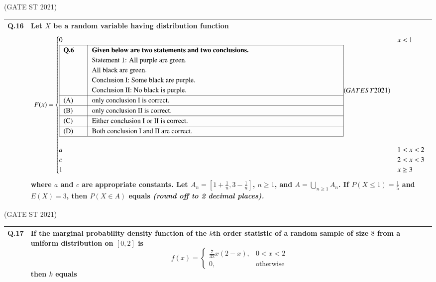 \documentclass[journal,12pt,onecolumn]{IEEEtran}
\theoremstyle{remark}
\begin{document}
\bigskip
\hfill (GATE ST 2021)
\\

\begin{tabular}{|p{1cm}|p{14cm}|}
\hline
\textbf{Q.16} &
Let $X$ be a random variable having distribution function
$$
F(x) = 
\begin{cases}
0 & x < 1\\\begin{tabular}{|p{1cm}|p{12.5cm}|}
\hline
\textbf{Q.6} &  \textbf{Given below are two statements and two conclusions.}\\ & Statement 1: All purple are green. \\ & All black are green. \\ & Conclusion I: Some black are purple. \\ & Conclusion II: No black is purple.\\
\hline
(A) & only conclusion I is correct. \\
\hline
(B) & only conclusion II is correct. \\
\hline
(C) & Either conclusion I or II is correct. \\
\hline
(D) & Both conclusion I and II are correct. \\
\hline
\end{tabular}

\bigskip
\hfill(GATE ST 2021)
\\

a & 1 < x < 2\\
c & 2 < x < 3\\
1 & x \geq 3
\end{cases}
$$
where $a$ and $c$ are appropriate constants. Let $A_n = [1 + \frac{1}{n}, 3 - \frac{1}{n}]$, $n \geq 1$, and $A = \bigcup_{n \geq 1} A_n$. If $P(X \leq 1) = \frac{1}{5}$ and $E(X) = 3$, then $P(X \in A)$ equals \textit{(round off to 2 decimal places).} \\
\hline
\end{tabular}

\bigskip
\hfill (GATE ST 2021)
\\

\begin{tabular}{|p{1cm}|p{14cm}|}
\hline
\textbf{Q.17} &
If the marginal probability density function of the $k$th order statistic of a random sample of size $8$ from a uniform distribution on $[0,2]$ is
$$
f(x) = 
\begin{cases}
\frac{7}{32}x(2-x), & 0 < x < 2 \\
0, & \text{otherwise}
\end{cases}
$$
then $k$ equals\\
\hline
\end{tabular}
\end{document}

